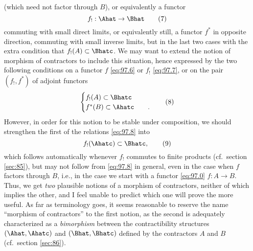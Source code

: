 (which need not factor through $B$), or equivalently a functor
\begin{equation}
  \label{eq:97.7}
  f_!:\Ahat\to\Bhat\tag{7}
\end{equation}
commuting with small direct limits, or equivalently still, a functor
$f^*$ in opposite direction, commuting with small inverse limits, but
in the last two cases with the extra condition that $f_!(A)\subset
\Bhatc$. We may want to extend the notion of morphism of contractors
to include this situation, hence expressed by the two following
conditions on a functor $f$ \eqref{eq:97.6} or $f_!$ \eqref{eq:97.7},
or on the pair $(f_!,f^*)$ of adjoint functors
\begin{equation}
  \label{eq:97.8}
  \begin{cases}
    f_!(A)\subset\Bhatc &\\
    f^*(B)\subset\Ahatc &\quad.
  \end{cases}\tag{8}
\end{equation}
However, in order for this notion to be stable under composition, we
should strengthen the first of the relations \eqref{eq:97.8} into
\begin{equation}
  \label{eq:97.9}
  f_!(\Ahatc)\subset\Bhatc,\tag{9}
\end{equation}
which follows automatically whenever $f_!$ commutes to finite products
(cf.\ section \ref{sec:85}), but may not follow from \eqref{eq:97.8}
in general, even in the case when $f$ factors through $B$, i.e., in
the case we start with a functor \eqref{eq:97.0} $f:A\to B$. Thus, we
get \emph{two} plausible notions of a morphism of contractors, neither
of which implies the other, and I feel unable to predict which one
will prove the more useful. As far as terminology goes, it seems
reasonable to reserve the name ``morphism of contractors'' to the
first notion, as the second is adequately characterized as a
\emph{bimorphism} between the contractibility structures
$(\Ahat,\Ahatc)$ and $(\Bhat,\Bhatc)$ defined by the contractors $A$
and $B$ (cf.\ section \ref{sec:86}).

\bigbreak
\presectionfill{}\par

